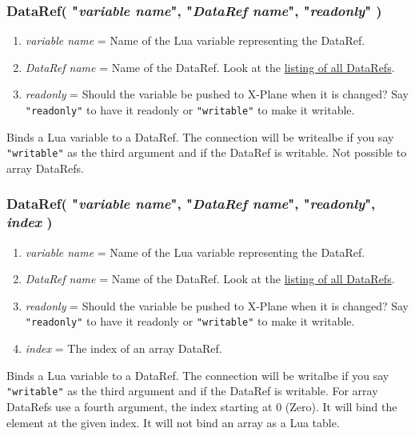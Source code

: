 \documentclass[11pt,parskip=half,a4paper]{scrartcl}
\begin{document}
\subsubsection{DataRef( "\emph{variable name}", "\emph{DataRef name}", "\emph{readonly}" )}

\begin{enumerate}
	\item \emph{variable name} = Name of the Lua variable representing the DataRef.
	\item \emph{DataRef name} = Name of the DataRef. Look at the \href{http://www.xsquawkbox.net/xpsdk/docs/DataRefs.html}{listing of all DataRefs}.
	\item \emph{readonly} = Should the variable be pushed to X-Plane when it is changed? Say \verb|"readonly"| to have it readonly or \verb|"writable"| to make it writable.
\end{enumerate}

Binds a Lua variable to a DataRef. The connection will be writealbe if you say \verb|"writable"| as the third argument and if the DataRef is writable. Not possible to array DataRefs.

\subsubsection{DataRef( "\emph{variable name}", "\emph{DataRef name}", "\emph{readonly}", \emph{index} )}

\begin{enumerate}
	\item \emph{variable name} = Name of the Lua variable representing the DataRef.
	\item \emph{DataRef name} = Name of the DataRef. Look at the \href{http://www.xsquawkbox.net/xpsdk/docs/DataRefs.html}{listing of all DataRefs}.
	\item \emph{readonly} = Should the variable be pushed to X-Plane when it is changed? Say \verb|"readonly"| to have it readonly or \verb|"writable"| to make it writable.
	\item \emph{index} = The index of an array DataRef.
\end{enumerate}

Binds a Lua variable to a DataRef. The connection will be writalbe if you say \verb|"writable"| as the third argument and if the DataRef is writable. For array DataRefs use a fourth argument, the index starting at 0 (Zero). It will bind the element at the given index. It will not bind an array as a Lua table.
\end{document}
